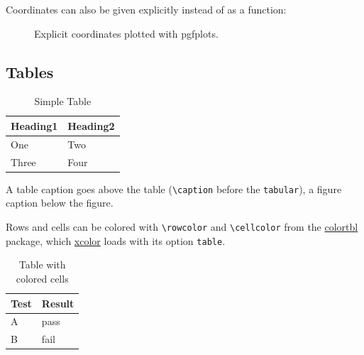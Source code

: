 Coordinates can also be given explicitly instead of as a function:
\begin{ltgexample}
\begin{figure}[ht]
  \centering
  \caption{Explicit coordinates plotted with pgfplots.}
  \label{fig:pgfplots_coords}
\end{figure}
\end{ltgexample}

\subsection{Tables}

\begin{ltgexample}
\begin{table}
  \caption{Simple Table}
  \label{tab:simple}
  \centering
  \begin{tabular}{ll}
    \toprule
    Heading1 & Heading2 \\
    \midrule
    One      & Two      \\
    Three    & Four     \\
    \bottomrule
  \end{tabular}
\end{table}
\end{ltgexample}

A table caption goes above the table (\verb|\caption| before the \verb|tabular|), a figure caption below the figure.

Rows and cells can be colored with \verb|\rowcolor| and \verb|\cellcolor| from the \href{https://ctan.org/pkg/colortbl}{colortbl} package, which \href{https://ctan.org/pkg/xcolor}{xcolor} loads with its option \verb|table|.

\begin{ltgexample}
\begin{table}
  \caption{Table with colored cells}
  \label{tab:colored}
  \centering
  \begin{tabular}{ll}
    \toprule
    \rowcolor{gray!20}
    Test & Result                   \\
    \midrule
    A    & \cellcolor{green!20}pass \\
    B    & \cellcolor{red!20}fail   \\
    \bottomrule
  \end{tabular}
\end{table}
\end{ltgexample}

